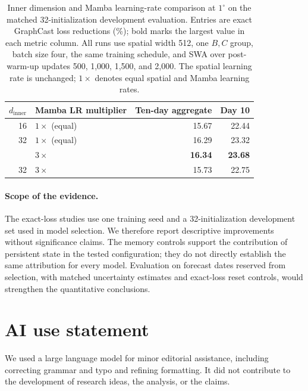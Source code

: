 \documentclass{article}
\begin{document}
\begin{table}[!h]
    \centering
    \caption{Inner dimension and Mamba learning-rate comparison at $1^\circ$ on the matched 32-initialization development evaluation. Entries are exact GraphCast loss reductions (\%); bold marks the largest value in each metric column. All runs use spatial width 512, one $B,C$ group, batch size four, the same training schedule, and SWA over post-warm-up updates 500, 1,000, 1,500, and 2,000. The spatial learning rate is unchanged; $1\times$ denotes equal spatial and Mamba learning rates.}
    \label{tab:res1_skill}
    \small
    \begin{tabular}{rlrr}
        \toprule
        $d_{\mathrm{inner}}$ & Mamba LR multiplier & Ten-day aggregate & Day 10 \\
        \midrule
        16 & $1\times$ (equal) & 15.67 & 22.44 \\
        32 & $1\times$ (equal) & 16.29 & 23.32 \\
        \addlinespace
        16 & $3\times$ & \textbf{16.34} & \textbf{23.68} \\
        32 & $3\times$ & 15.73 & 22.75 \\
        \bottomrule
    \end{tabular}
\end{table}

\paragraph{Scope of the evidence.}
The exact-loss studies use one training seed and a 32-initialization development set used in model selection. We therefore report descriptive improvements without significance claims. The memory controls support the contribution of persistent state in the tested configuration; they do not directly establish the same attribution for every model. Evaluation on forecast dates reserved from selection, with matched uncertainty estimates and exact-loss reset controls, would strengthen the quantitative conclusions.


\FloatBarrier

\clearpage
\section*{AI use statement}
We used a large language model for minor editorial assistance, including correcting grammar and
typo and refining formatting. It did not contribute to the development of research ideas, the analysis,
or the claims.
\end{document}
